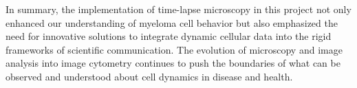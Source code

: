 






















In summary, the implementation of time-lapse microscopy in this project not only
enhanced our understanding of myeloma cell behavior but also emphasized the need
for innovative solutions to integrate dynamic cellular data into the rigid
frameworks of scientific communication. The evolution of microscopy and image
analysis into image cytometry continues to push the boundaries of what can be
observed and understood about cell dynamics in disease and health.



